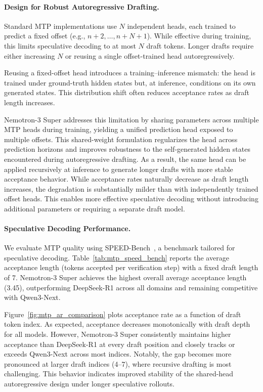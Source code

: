 \paragraph{Design for Robust Autoregressive Drafting.} Standard MTP implementations use $N$ independent heads, each trained to predict a fixed offset (e.g., $n+2, \dots, n+N+1$). While effective during training, this limits speculative decoding to at most $N$ draft tokens. Longer drafts require either increasing $N$ or reusing a single offset-trained head autoregressively.

Reusing a fixed-offset head introduces a training--inference mismatch: the head is trained under ground-truth hidden states but, at inference, conditions on its own generated states. This distribution shift often reduces acceptance rates as draft length increases.



Nemotron-3 Super addresses this limitation by sharing parameters across multiple MTP heads during training, yielding a unified prediction head exposed to multiple offsets. This shared-weight formulation regularizes the head across prediction horizons and improves robustness to the self-generated hidden states encountered during autoregressive drafting. As a result, the same head can be applied recursively at inference to generate longer drafts with more stable acceptance behavior. While acceptance rates naturally decrease as draft length increases, the degradation is substantially milder than with independently trained offset heads. This enables more effective speculative decoding without introducing additional parameters or requiring a separate draft model.





\paragraph{Speculative Decoding Performance.}
We evaluate MTP quality using SPEED-Bench~\citep{speedbenchnvidia}, a benchmark tailored for speculative decoding. Table~\ref{tab:mtp_speed_bench} reports the average acceptance length (tokens accepted per verification step) with a fixed draft length of 7. Nemotron-3 Super achieves the highest overall average acceptance length (3.45), outperforming DeepSeek-R1 across all domains and remaining competitive with Qwen3-Next.

Figure~\ref{fig:mtp_ar_comparison} plots acceptance rate as a function of draft token index. As expected, acceptance decreases monotonically with draft depth for all models. However, Nemotron-3 Super consistently maintains higher acceptance than DeepSeek-R1 at every draft position and closely tracks or exceeds Qwen3-Next across most indices. Notably, the gap becomes more pronounced at larger draft indices (4–7), where recursive drafting is most challenging. This behavior indicates improved stability of the shared-head autoregressive design under longer speculative rollouts.

